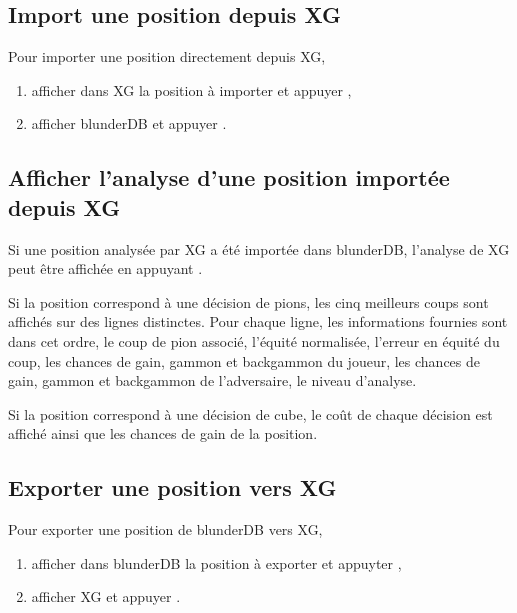 \documentclass[letterpaper,10pt,french]{sphinxmanual}
\begin{document}
\subsection{Import une position depuis XG}
\label{\detokenize{guide_utilisateur:import-une-position-depuis-xg}}
\sphinxAtStartPar
Pour importer une position directement depuis XG,
\begin{enumerate}
%
\item {} 
\sphinxAtStartPar
afficher dans XG la position à importer et appuyer ,

\item {} 
\sphinxAtStartPar
afficher blunderDB et appuyer .

\end{enumerate}


\subsection{Afficher l’analyse d’une position importée depuis XG}
\label{\detokenize{guide_utilisateur:afficher-l-analyse-d-une-position-importee-depuis-xg}}
\sphinxAtStartPar
Si une position analysée par XG a été importée dans blunderDB, l’analyse de XG
peut être affichée en appuyant .

\sphinxAtStartPar
Si la position correspond à une décision de pions, les cinq meilleurs coups
sont affichés sur des lignes distinctes. Pour chaque ligne, les informations
fournies sont dans cet ordre, le coup de pion associé, l’équité normalisée,
l’erreur en équité du coup, les chances de gain, gammon et backgammon du
joueur, les chances de gain, gammon et backgammon de l’adversaire, le niveau
d’analyse.

\sphinxAtStartPar
Si la position correspond à une décision de cube, le coût de chaque décision
est affiché ainsi que les chances de gain de la position.


\subsection{Exporter une position vers XG}
\label{\detokenize{guide_utilisateur:exporter-une-position-vers-xg}}
\sphinxAtStartPar
Pour exporter une position de blunderDB vers XG,
\begin{enumerate}
%
\item {} 
\sphinxAtStartPar
afficher dans blunderDB la position à exporter et appuyter ,

\item {} 
\sphinxAtStartPar
afficher XG et appuyer .

\end{enumerate}
\end{document}
